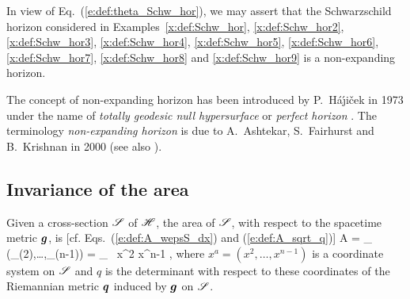 {{\begin{example}
In view of Eq.~(\ref{e:def:theta_Schw_hor}), we may assert that the
Schwarz\-schild horizon considered in Examples~\ref{x:def:Schw_hor}, \ref{x:def:Schw_hor2},
\ref{x:def:Schw_hor3}, \ref{x:def:Schw_hor4}, \ref{x:def:Schw_hor5}, \ref{x:def:Schw_hor6},
\ref{x:def:Schw_hor7}, \ref{x:def:Schw_hor8} and \ref{x:def:Schw_hor9} is a non-expanding horizon.
\end{example}

\begin{hist}\label{h:def:NEH}
The concept of non-expanding horizon has been introduced by P.~H\'a\'\j i\v{c}ek
in 1973 under the name of \emph{totally geodesic null hypersurface} \cite{Hajic73a}
or \emph{perfect horizon} \cite{Hajic73b,Hajic74}.
The terminology \emph{non-expanding horizon} is due to A.~Ashtekar, S.~Fairhurst
and B.~Krishnan in 2000 \cite{AshteFK00} (see also \cite{AshteBL02}).
\end{hist}

\subsection{Invariance of the area}

Given a cross-section $\mathscr{S}$ of $\mathscr{H}$, the area of $\mathscr{S}$, with respect to the spacetime metric $\bm{g}$, is [cf. Eqs.~(\ref{e:def:A_wepsS_dx}) and (\ref{e:def:A_sqrt_q})]
\be \label{e:def:total_area}
    A = \int_{\Sp} \wepsS(\D{}_{(2)},\ldots,\D{}_{(n-1)})
        = \int_{\Sp}  \, \D x^2 \cdots \D x^{n-1} ,
\ee
where $x^a = (x^2, \ldots, x^{n-1})$ is a coordinate system on $\mathscr{S}$ and $q$ is
the determinant with respect to these coordinates of the Riemannian metric $\bm{q}$
induced by $\bm{g}$ on $\mathscr{S}$.

}}
